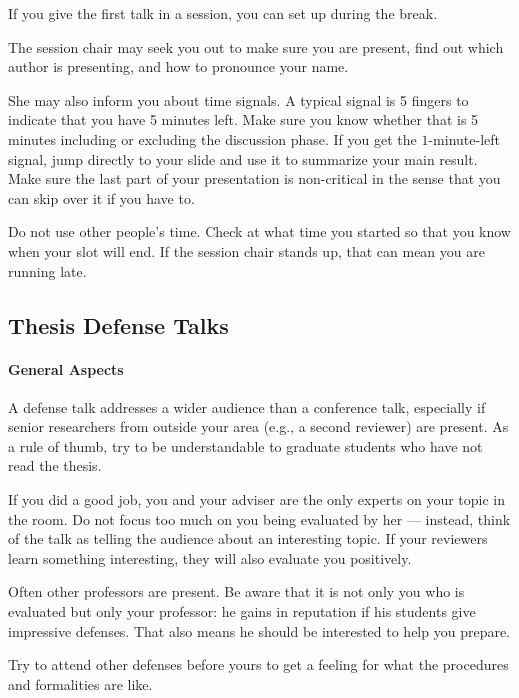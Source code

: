 \documentclass[12pt]{article}
\begin{document}
If you give the first talk in a session, you can set up during the break.
\medskip

The session chair may seek you out to make sure you are present, find out which author is presenting, and how to pronounce your name.

She may also inform you about time signals.
A typical signal is 5 fingers to indicate that you have 5 minutes left.
Make sure you know whether that is 5 minutes including or excluding the discussion phase.
If you get the $1$-minute-left signal, jump directly to your slide and use it to summarize your main result.
Make sure the last part of your presentation is non-critical in the sense that you can skip over it if you have to.
\medskip

Do not use other people's time.
Check at what time you started so that you know when your slot will end.
If the session chair stands up, that can mean you are running late.

\subsection{Thesis Defense Talks}

\paragraph{General Aspects}
A defense talk addresses a wider audience than a conference talk, especially if senior researchers from outside your area (e.g., a second reviewer) are present.
As a rule of thumb, try to be understandable to graduate students who have not read the thesis.
\medskip

If you did a good job, you and your adviser are the only experts on your topic in the room.
Do not focus too much on you being evaluated by her --- instead, think of the talk as telling the audience about an interesting topic.
If your reviewers learn something interesting, they will also evaluate you positively. 
\medskip

Often other professors are present.
Be aware that it is not only you who is evaluated but only your professor: he gains in reputation if his students give impressive defenses.
That also means he should be interested to help you prepare. 
\medskip

Try to attend other defenses before yours to get a feeling for what the procedures and formalities are like.
\end{document}
